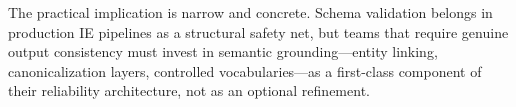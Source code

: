\documentclass[sigconf]{acmart}
\begin{document}
The practical implication is narrow and concrete. Schema validation belongs in production IE pipelines as a structural safety net, but teams that require genuine output consistency must invest in semantic grounding---entity linking, canonicalization layers, controlled vocabularies---as a first-class component of their reliability architecture, not as an optional refinement.



\end{document}
